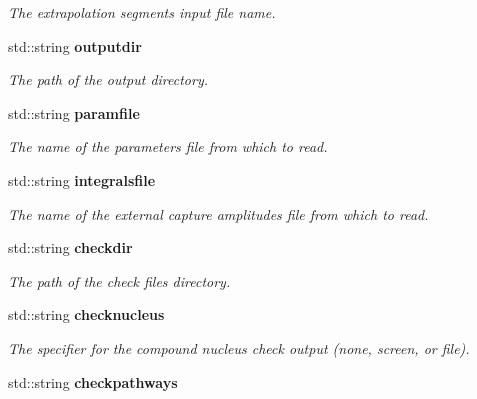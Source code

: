 \begin{CompactItemize}
\begin{CompactList}\small\item\em The extrapolation segments input file name. \item\end{CompactList}\item 
std::string \bf{outputdir}\label{structConfig_5a9a0ab96e1f23a30cb84ed03bfaee3e}

\begin{CompactList}\small\item\em The path of the output directory. \item\end{CompactList}\item 
std::string \bf{paramfile}\label{structConfig_c2d0d1b72f0b982c7755945bc11861e2}

\begin{CompactList}\small\item\em The name of the parameters file from which to read. \item\end{CompactList}\item 
std::string \bf{integralsfile}\label{structConfig_21150f56337fcca22e646e7e8bea6866}

\begin{CompactList}\small\item\em The name of the external capture amplitudes file from which to read. \item\end{CompactList}\item 
std::string \bf{checkdir}\label{structConfig_d2f2c592b83f9bd10118783d361d4a71}

\begin{CompactList}\small\item\em The path of the check files directory. \item\end{CompactList}\item 
std::string \bf{checknucleus}\label{structConfig_9afb9dd5ed6162c9c927d557b8fc668a}

\begin{CompactList}\small\item\em The specifier for the compound nucleus check output (none, screen, or file). \item\end{CompactList}\item 
std::string \bf{checkpathways}\label{structConfig_49e88a1097c83390f021cb961880a1a7}


\end{CompactItemize}
